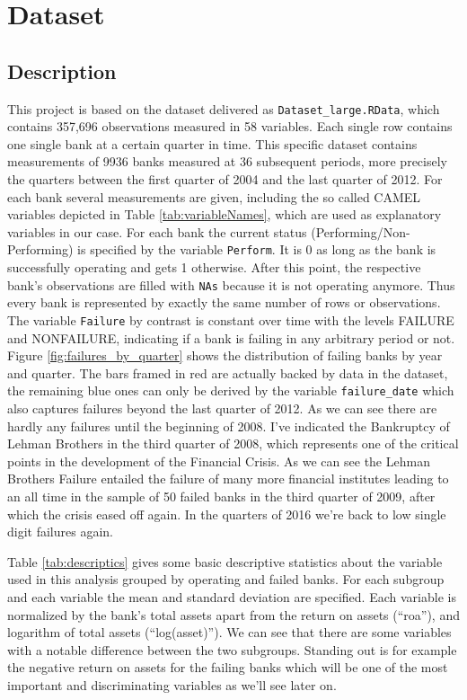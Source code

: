 \documentclass[12pt,a4paper]{article}
\begin{document}
\section{Dataset}
\subsection{Description}
This project is based on the dataset delivered as \verb+Dataset_large.RData+, which contains 357,696 observations measured in 58 variables. Each single row contains one single bank at a certain quarter in time. This specific dataset contains measurements of 9936 banks measured at 36 subsequent periods, more precisely the quarters between the first quarter of 2004 and the last quarter of 2012. For each bank several measurements are given, including the so called CAMEL variables depicted in Table \ref{tab:variableNames}, which are used as explanatory variables in our case. For each bank the current status (Performing/Non-Performing) is specified by the variable \verb+Perform+. It is 0 as long as the bank is successfully operating and gets 1 otherwise. After this point, the respective bank's observations are filled with \verb+NAs+ because it is not operating anymore. Thus every bank is represented by exactly the same number of rows or observations. The variable \verb+Failure+ by contrast is constant over time with the levels FAILURE and NONFAILURE, indicating if a bank is failing in any arbitrary period or not. Figure \ref{fig:failures_by_quarter} shows the distribution of failing banks by year and quarter. The bars framed in red are actually backed by data in the dataset, the remaining blue ones can only be derived by the variable \verb+failure_date+ which also captures failures beyond the last quarter of 2012. As we can see there are hardly any failures until the beginning of 2008. I've indicated the Bankruptcy of Lehman Brothers in the third quarter of 2008, which represents one of the critical points in the development of the Financial Crisis. As we can see the Lehman Brothers Failure entailed the failure of many more financial institutes leading to an all time in the sample of 50 failed banks in the third quarter of 2009, after which the crisis eased off again. In the quarters of 2016 we're back to low single digit failures again.\par
Table \vref{tab:descriptics} gives some basic descriptive statistics about the variable used in this analysis grouped by operating and failed banks. For each subgroup and each variable the mean and standard deviation are specified. Each variable is normalized by the bank's total assets apart from the return on assets (\enquote{roa}), and logarithm of total assets (\enquote{log(asset)}). We can see that there are some variables with a notable difference between the two subgroups. Standing out is for example the negative return on assets for the failing banks which will be one of the most important and discriminating variables as we'll see later on.
\end{document}
